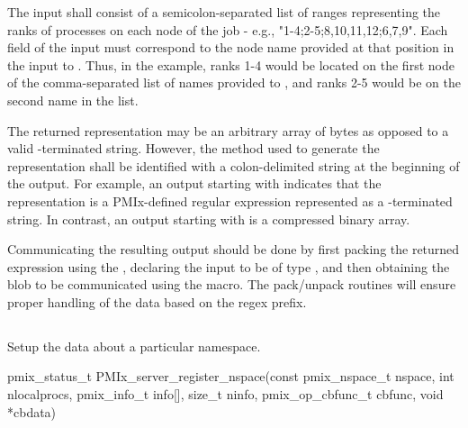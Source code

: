 \descr

The input shall consist of a semicolon-separated list of ranges representing the ranks of processes on each node of the job - e.g.,  "1-4;2-5;8,10,11,12;6,7,9". Each field of the input must correspond to the node name provided at that position in the input to . Thus, in the example, ranks 1-4 would be located on the first node of the comma-separated list of names provided to , and ranks 2-5 would be on the second name in the list.

\advicermstart
The returned representation may be an arbitrary array of bytes as opposed to a valid -terminated string. However, the method used to generate the representation shall be identified with a colon-delimited string at the beginning of the output. For example, an output starting with  indicates that the representation is a \ac{PMIx}-defined regular expression represented as a -terminated string. In contrast, an output starting with  is a compressed binary array.

Communicating the resulting output should be done by first packing the returned expression using the , declaring the input to be of type , and then obtaining the blob to be communicated using the  macro. The pack/unpack routines will ensure proper handling of the data based on the regex prefix.
\advicermend

\subsection{}

\summary

Setup the data about a particular namespace.

\format

\cspecificstart
\begin{codepar}
pmix_status_t
PMIx_server_register_nspace(const pmix_nspace_t nspace,
                        int nlocalprocs,
                        pmix_info_t info[], size_t ninfo,
                        pmix_op_cbfunc_t cbfunc, void *cbdata)
\end{codepar}
\cspecificend

\begin{arglist}
\end{arglist}

